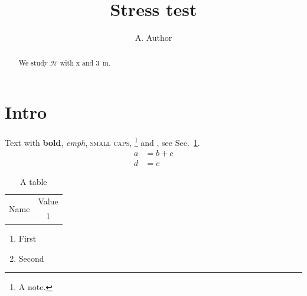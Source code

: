 \documentclass[aps,prl,twocolumn]{revtex4-2}
\newcommand{\ham}{\mathcal{H}}
\newcommand{\avg}[1]{\langle #1 \rangle}
\begin{document}
\title{Stress test}
\author{A. Author}
\begin{abstract}
We study $\ham$ with \avg{x} and \SI{3}{\meter}.
\end{abstract}
\maketitle
\section{Intro}\label{sec:intro}
Text with \textbf{bold}, \emph{emph}, \textsc{small caps}, \footnote{A note.} and \cite{key1,key2}, see Sec.~\ref{sec:intro}.
\begin{align}
a &= b + c \label{eq:a}\\
d &= e
\end{align}
\begin{table}
\begin{tabular}{|l|c|}
\hline
\multirow{2}{*}{Name} & Value \\
 & 1 \\
\hline
\end{tabular}
\caption{A table}
\end{table}
\begin{enumerate}
\item First \item Second
\end{enumerate}

\end{document}
